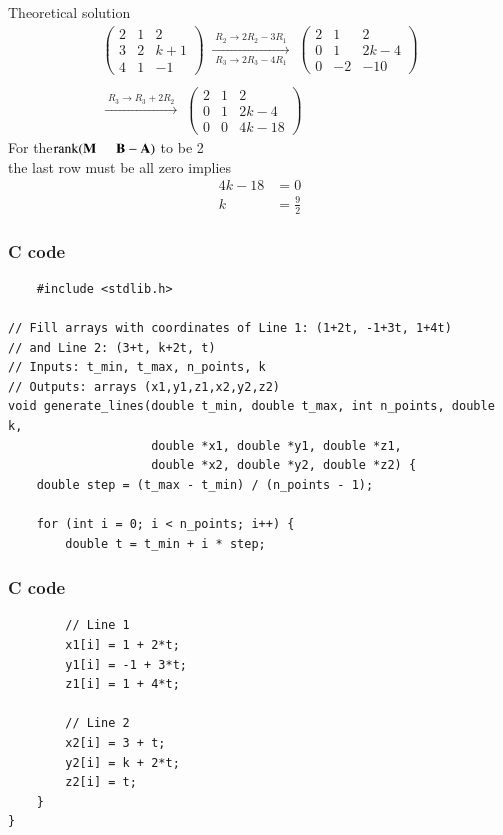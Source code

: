 \documentclass{beamer}
\begin{document}
\begin{frame}{Theoretical solution}
\begin{align}
\begin{pmatrix}
2 & 1 & 2\\
3 & 2 & k+1\\
4 & 1 & -1
\end{pmatrix}
\;\xrightarrow[\;R_3 \to 2R_3 - 4R_1\;]{\;R_2 \to 2R_2 - 3R_1\;}\;
\begin{pmatrix}
2 & 1 & 2\\
0 & 1 & 2k-4\\
0 & -2 & -10
\end{pmatrix}\\
\;\\\xrightarrow[\;]{\;R_3 \to R_3 + 2R_2\;}\;
\begin{pmatrix}
2 &1 & 2\\
0 & 1 & 2k-4\\
0 & 0 & 4k-18
\end{pmatrix}\end{align}
For the$ \operatorname{rank}(\vec{M} \hspace{5mm}  \vec{B-A})$ to be 2\\
the last row must be all zero implies\\
\begin{align}
4k-18&=0\\
k&=\tfrac{9}{2}
\end{align}
\end{frame}
\begin{frame}[fragile]
    \frametitle{C code}
    \begin{lstlisting}
    #include <stdlib.h>

// Fill arrays with coordinates of Line 1: (1+2t, -1+3t, 1+4t)
// and Line 2: (3+t, k+2t, t)
// Inputs: t_min, t_max, n_points, k
// Outputs: arrays (x1,y1,z1,x2,y2,z2)
void generate_lines(double t_min, double t_max, int n_points, double k,
                    double *x1, double *y1, double *z1,
                    double *x2, double *y2, double *z2) {
    double step = (t_max - t_min) / (n_points - 1);

    for (int i = 0; i < n_points; i++) {
        double t = t_min + i * step;
        \end{lstlisting}
\end{frame}
\begin{frame}[fragile]
    \frametitle{C code}
    \begin{lstlisting}
        // Line 1
        x1[i] = 1 + 2*t;
        y1[i] = -1 + 3*t;
        z1[i] = 1 + 4*t;

        // Line 2
        x2[i] = 3 + t;
        y2[i] = k + 2*t;
        z2[i] = t;
    }
}
 \end{lstlisting}
\end{frame}
\end{document}
